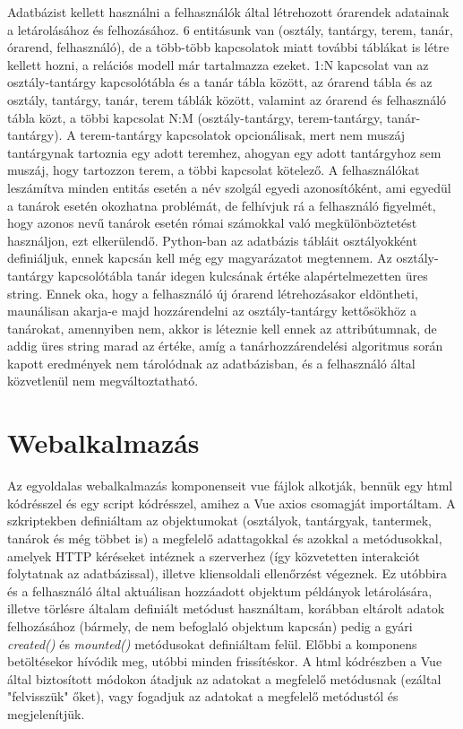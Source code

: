 \documentclass[12pt,a4paper]{report}
\begin{document}
Adatbázist kellett használni a felhasználók által létrehozott órarendek adatainak a letárolásához és felhozásához. 6 entitásunk van (osztály, tantárgy, terem, tanár, órarend, felhasználó), de a több-több kapcsolatok miatt további táblákat is létre kellett hozni, a relációs modell már tartalmazza ezeket. 1:N kapcsolat van az osztály-tantárgy kapcsolótábla és a tanár tábla között, az órarend tábla és az osztály, tantárgy, tanár, terem táblák között, valamint az órarend és felhasználó tábla közt, a többi kapcsolat N:M (osztály-tantárgy, terem-tantárgy, tanár-tantárgy). A terem-tantárgy kapcsolatok opcionálisak, mert nem muszáj tantárgynak tartoznia egy adott teremhez, ahogyan egy adott tantárgyhoz sem muszáj, hogy tartozzon terem, a többi kapcsolat kötelező. A felhasználókat leszámítva minden entitás esetén a név szolgál egyedi azonosítóként, ami egyedül a tanárok esetén okozhatna problémát, de felhívjuk rá a felhasználó figyelmét, hogy azonos nevű tanárok esetén római számokkal való megkülönböztetést használjon, ezt elkerülendő. Python-ban az adatbázis tábláit osztályokként definiáljuk, ennek kapcsán kell még egy magyarázatot megtennem. Az osztály-tantárgy kapcsolótábla tanár idegen kulcsának értéke alapértelmezetten üres string. Ennek oka, hogy a felhasználó új órarend létrehozásakor eldöntheti, maunálisan akarja-e majd hozzárendelni az osztály-tantárgy kettősökhöz a tanárokat, amennyiben nem, akkor is léteznie kell ennek az attribútumnak, de addig üres string marad az értéke, amíg a tanárhozzárendelési algoritmus során kapott eredmények nem tárolódnak az adatbázisban, és a felhasználó által közvetlenül nem megváltoztatható.

\section{Webalkalmazás}

Az egyoldalas webalkalmazás komponenseit vue fájlok alkotják, bennük egy html kódrésszel és egy script kódrésszel, amihez a Vue axios csomagját importáltam. A szkriptekben definiáltam az objektumokat (osztályok, tantárgyak, tantermek, tanárok és még többet is) a megfelelő adattagokkal és azokkal a metódusokkal, amelyek HTTP kéréseket intéznek a szerverhez (így közvetetten interakciót folytatnak az adatbázissal), illetve kliensoldali ellenőrzést végeznek. Ez utóbbira és a felhasználó által aktuálisan hozzáadott objektum példányok letárolására, illetve törlésre általam definiált metódust használtam, korábban eltárolt adatok felhozásához (bármely, de nem befoglaló objektum kapcsán) pedig a gyári \textit{created()} és \textit{mounted()} metódusokat definiáltam felül. Előbbi a komponens betöltésekor hívódik meg, utóbbi minden frissítéskor. A html kódrészben a Vue által biztosított módokon átadjuk az adatokat a megfelelő metódusnak (ezáltal "felvisszük" őket), vagy fogadjuk az adatokat a megfelelő metódustól és megjelenítjük.
\end{document}
